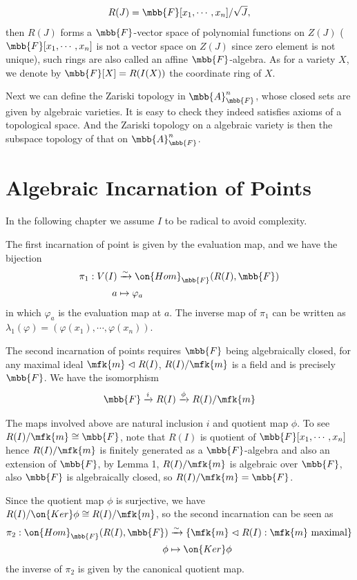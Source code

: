 \documentclass[12pt]{article}
\begin{document}
$$
R(J)=\mbb{F}[x_1,\cdots,x_n]/\sqrt{J},
$$
then $R(J)$ forms a  $\mbb{F}$-vector space of polynomial functions on $Z(J)$ ($\mbb{F}[x_1,\cdots,x_n]$ is not a vector space on $Z(J)$ since zero element is not unique), such rings are also called an affine $\mbb{F}$-algebra. As for a variety $X$, we denote by $\mbb{F}[X]=R(I(X))$ the coordinate ring of $X$.


Next we can define the Zariski topology in $\mbb{A}_{\mbb{F}}^n$, whose closed sets are given by algebraic varieties. It is easy to check they indeed satisfies axioms of a topological space. And the Zariski topology on a algebraic variety is then the subspace topology of that on $\mbb{A}_{\mbb{F}}^n$.

\section{Algebraic Incarnation of Points}

In the following chapter we assume $I$ to be radical to avoid complexity.


The first incarnation of point is given by the evaluation map, and we have the bijection
\begin{align*}
	\pi_1:V(I)&\xrightarrow{\sim}\on{Hom}_{\mbb{F}}(R(I),\mbb{F})\\
	a&\mapsto\varphi_a
\end{align*}
in which $\varphi_a$ is the evaluation map at $a$. The inverse map of $\pi_1$ can be written as $\lambda_1(\varphi)=(\varphi(x_1),\cdots,\varphi(x_n))$.

The second incarnation of points requires $\mbb{F}$ being algebraically closed, for any maximal ideal $\mfk{m}\vartriangleleft R(I)$, $R(I)/\mfk{m}$ is a field and is precisely $\mbb{F}$. We have  the isomorphism
$$
\mbb{F}\xrightarrow{i}R(I)\xrightarrow{\phi}R(I)/\mfk{m}
$$

The maps involved above are natural inclusion $i$ and quotient map $\phi$. To see $R(I)/\mfk{m}\cong\mbb{F}$, note that $R(I)$ is quotient of $\mbb{F}[x_1,\cdots,x_n]$ hence $R(I)/\mfk{m}$ is finitely generated as a $\mbb{F}$-algebra and also an extension of $\mbb{F}$, by Lemma 1, $R(I)/\mfk{m}$ is algebraic over $\mbb{F}$, also $\mbb{F}$ is algebraically closed, so $R(I)/\mfk{m}=\mbb{F}$.

Since the quotient map $\phi$ is surjective, we have $R(I)/\on{Ker}\phi\cong R(I)/\mfk{m}$, so the second incarnation can be seen as
\begin{align*}
	\pi_2:\on{Hom}_{\mbb{F}}(R(I),\mbb{F})&\xrightarrow{\sim}\{\mfk{m}\vartriangleleft R(I):\mfk{m}~\text{maximal}\}\\
	\phi&\mapsto\on{Ker}\phi
\end{align*}
the inverse of $\pi_2$ is given by the canonical quotient map.
\end{document}
